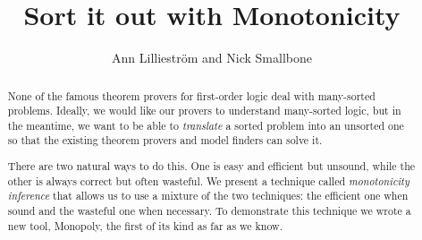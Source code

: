 \documentclass{llncs}
\title{Sort it out with Monotonicity}
\author{Ann Lilliestr\"om and Nick Smallbone}
\institute{ Chalmers University of Technology, Gothenburg, Sweden
         \\ \email{\{annl,nicsma\}@chalmers.se}
          }
\begin{document}
\maketitle

\begin{abstract}
None of the famous theorem provers for first-order logic deal with
many-sorted problems. Ideally, we would like our provers to understand
many-sorted logic, but in the meantime, we want to be able to
\emph{translate} a sorted problem into an unsorted one so that the
existing theorem provers and model finders can solve it.

There are two natural ways to do this. One is easy and efficient
but unsound, while the other is always correct but often wasteful. 
We present a technique called
\emph{monotonicity inference} that allows us to use a mixture of the
two techniques: the efficient one when sound and the wasteful one when
necessary. To demonstrate this technique we wrote a new tool,
Monopoly, the first of its kind as far as we know.
\end{abstract}







 
\end{document}
